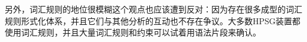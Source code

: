 
另外，词汇规则的地位很模糊这个观点也应该遭到反对：因为存在很多成型的词汇规则形式化体系\citep{Meurers2001a,CB92a,LC99a}，并且它们与其他分析的互动也不存在争议。大多数HPSG装置都使用词汇规则，并且大量词汇规则和约束可以试着用语法片段来确认。

